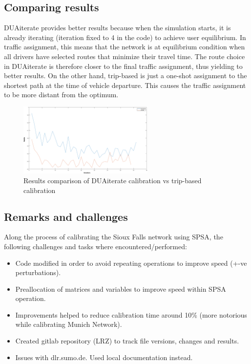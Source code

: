 \subsection{Comparing results}
DUAiterate provides better results because when the simulation starts, it is already iterating (iteration fixed to 4 in the code) to achieve user equilibrium. In traffic assignment, this means that the network is at equilibrium condition when all drivers have selected routes that minimize their travel time. The route choice in DUAiterate is therefore closer to the final traffic assignment, thus yielding to better results. On the other hand, trip-based is just a one-shot assignment to the shortest path at the time of vehicle departure. This causes the traffic assignment to be more distant from the optimum.

\begin{figure}[htpb]
  \centering
  \includegraphics[width=0.6\textwidth]{figures/dua-trip-comparison.png}
  \caption{Results comparison of DUAiterate calibration vs trip-based calibration}
  \label{fig:dua-vs-trip-sf}
\end{figure}

\subsection{Remarks and challenges}
Along the process of calibrating the Sioux Falls network using SPSA, the following challenges and tasks where encountered/performed: 

\begin{itemize}
  \item Code modified in order to avoid repeating operations to improve speed (+-ve perturbations).
  \item Preallocation of matrices and variables to improve speed within SPSA operation.
  \item Improvements helped to reduce calibration time around 10\% (more notorious while calibrating Munich Network).
  \item Created gitlab repository (LRZ) to track file versions, changes and results. 
  \item Issues with dlr.sumo.de. Used local documentation instead.
\end{itemize}
